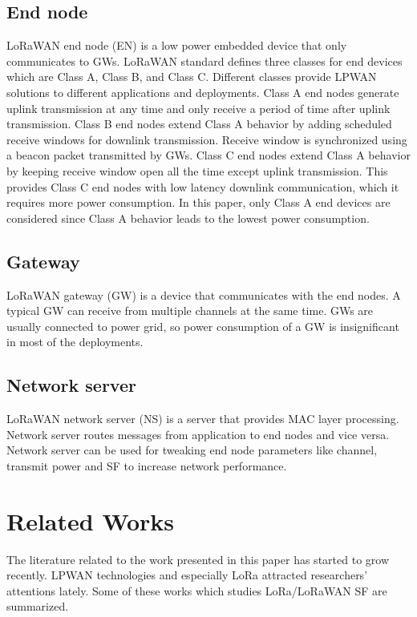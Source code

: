 \documentclass[conference]{IEEEtran}
\begin{document}
\subsection{End node}
\par LoRaWAN end node (EN) is a low power embedded device that only communicates to GWs. LoRaWAN standard defines three classes for end devices which are Class A, Class B, and Class C. Different classes provide LPWAN solutions to different applications and deployments. Class A end nodes generate uplink transmission at any time and only receive a period of time after uplink transmission. Class B end nodes extend Class A behavior by adding scheduled receive windows for downlink transmission. Receive window is synchronized using a beacon packet transmitted by GWs. Class C end nodes extend Class A behavior by keeping receive window open all the time except uplink transmission. This provides Class C end nodes with low latency downlink communication, which it requires more power consumption. In this paper, only Class A end devices are considered since Class A behavior leads to the lowest power consumption.

\subsection{Gateway}
\par LoRaWAN gateway (GW) is a device that communicates with the end nodes. A typical GW can receive from multiple channels at the same time. GWs are usually connected to power grid, so power consumption of a GW is insignificant in most of the deployments.

\subsection{Network server}
\par LoRaWAN network server (NS) is a server that provides MAC layer processing. Network server routes messages from application to end nodes and vice versa. Network server can be used for tweaking end node parameters like channel, transmit power and SF to increase network performance.


\section{Related Works} \label{Related Works}
\par The literature related to the work presented in this paper has started to grow recently. LPWAN technologies and especially LoRa attracted researchers’ attentions lately. Some of these works which studies LoRa/LoRaWAN SF are summarized.
\end{document}
